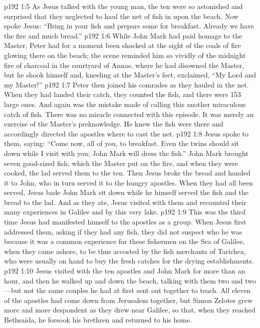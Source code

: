 \vs p192 1:5 As Jesus talked with the young man, the ten were so astonished and surprised that they neglected to haul the net of fish in upon the beach. Now spoke Jesus: \textcolor{ubdarkred}{“Bring in your fish and prepare some for breakfast. Already we have the fire and much bread.”}
\vs p192 1:6 While John Mark had paid homage to the Master, Peter had for a moment been shocked at the sight of the coals of fire glowing there on the beach; the scene reminded him so vividly of the midnight fire of charcoal in the courtyard of Annas, where he had disowned the Master, but he shook himself and, kneeling at the Master’s feet, exclaimed, “My Lord and my Master!”
\vs p192 1:7 Peter then joined his comrades as they hauled in the net. When they had landed their catch, they counted the fish, and there were 153 large ones. And again was the mistake made of calling this another miraculous catch of fish. There was no miracle connected with this episode. It was merely an exercise of the Master’s preknowledge. He knew the fish were there and accordingly directed the apostles where to cast the net.\plusone
\vs p192 1:8 Jesus spoke to them, saying: \textcolor{ubdarkred}{“Come now, all of you, to breakfast. Even the twins should sit down while I visit with you; John Mark will dress the fish.”} John Mark brought seven good\hyp{}sized fish, which the Master put on the fire, and when they were cooked, the lad served them to the ten. Then Jesus broke the bread and handed it to John, who in turn served it to the hungry apostles. When they had all been served, Jesus bade John Mark sit down while he himself served the fish and the bread to the lad. And as they ate, Jesus visited with them and recounted their many experiences in Galilee and by this very lake.
\pc \vs p192 1:9 This was the third time Jesus had manifested himself to the apostles as a group. When Jesus first addressed them, asking if they had any fish, they did not suspect who he was because it was a common experience for these fishermen on the Sea of Galilee, when they came ashore, to be thus accosted by the fish merchants of Tarichea, who were usually on hand to buy the fresh catches for the drying establishments.
\pc \vs p192 1:10 Jesus visited with the ten apostles and John Mark for more than an hour, and then he walked up and down the beach, talking with them two and two---but not the same couples he had at first sent out together to teach. All eleven of the apostles had come down from Jerusalem together, but Simon Zelotes grew more and more despondent as they drew near Galilee, so that, when they reached Bethsaida, he forsook his brethren and returned to his home.
